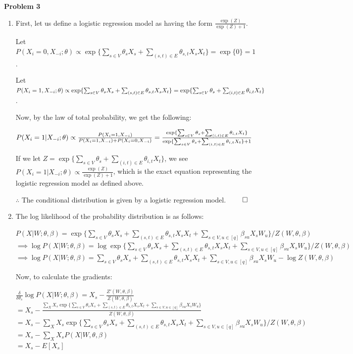 \documentclass[12pt]{article}
\begin{document}
\pagebreak\textbf{Problem 3}
\begin{enumerate}
	\item First, let us define a logistic regression model as having the form $\frac{\exp(Z)}{\exp(Z) + 1}$.
	
	Let $P(X_i = 0, X_{-i} ; \theta) \propto \exp\{\sum_{s\in V}\theta_s X_s + \sum_{(s, t) \in E} \theta_{s, t} X_s X_t\} = \exp\{0\} = 1$.
	
	Let $P(X_i = 1, X_{-i} ; \theta) \propto \exp\{\sum_{s\in V}\theta_s X_s + \sum_{(s, t) \in E} \theta_{s, t} X_s X_t\} \\
	= \exp\{\sum_{s\in V}\theta_s + \sum_{(i, t) \in E} \theta_{i, t} X_t\}$.
	
	Now, by the law of total probability, we get the following:
	
	$P(X_i = 1 \vert X_{-i} ; \theta) \propto \frac{P(X_i = 1, X_{-i})}{P(X_i = 1, X_{-i}) + P(X_i = 0, X_{-i})}\\
	= \frac{\exp\{\sum_{s\in V}\theta_s + \sum_{(i, t) \in E} \theta_{i, t} X_t\}}{\exp\{\sum_{s\in V}\theta_s + \sum_{(i, t) \in E} \theta_{i, t} X_t\} + 1}$
	
	If we let $Z = \exp\{\sum_{s\in V}\theta_s + \sum_{(i, t) \in E} \theta_{i, t} X_t\}$, we see $P(X_i = 1 \vert X_{-i} ; \theta) \propto \frac{\exp(Z)}{\exp(Z) + 1}$, which is the exact equation representing the logistic regression model as defined above.
	
	$\therefore$ The conditional distribution is given by a logistic regression model. $\qed$
	
	\item The log likelihood  of the probability distribution is as follows:
	
	$P(X \vert W; \theta, \beta) = \exp\Bigg\{\sum_{s\in V} \theta_sX_s + \sum_{(s, t)\in E} \theta_{s, t}X_sX_t + \sum_{s\in V, u\in [q]} \beta_{su}X_sW_u \Bigg\} / Z(W, \theta, \beta)$\\
	$\implies \log P(X \vert W; \theta, \beta) = \log \exp\Bigg\{\sum_{s\in V} \theta_sX_s + \sum_{(s, t)\in E} \theta_{s, t}X_sX_t + \sum_{s\in V, u\in [q]} \beta_{su}X_sW_u \Bigg\} / Z(W, \theta, \beta)$\\
	$\implies \log P(X \vert W; \theta, \beta) = \sum_{s\in V} \theta_sX_s + \sum_{(s, t)\in E} \theta_{s, t}X_sX_t + \sum_{s\in V, u\in [q]} \beta_{su}X_sW_u - \log Z(W, \theta, \beta)$
	
	Now, to calculate the gradients:
	
	$\frac{\delta}{\delta\theta_s}\log P(X \vert W; \theta, \beta) = X_s - \frac{Z'(W, \theta, \beta)}{Z(W, \theta, \beta)}$\\
	$= X_s - \frac{\sum_{X}X_s\exp\Big\{\sum_{s\in V} \theta_sX_s + \sum_{(s, t)\in E} \theta_{s, t}X_sX_t + \sum_{s\in V, u\in [q]} \beta_{su}X_sW_u\Big\}}{Z(W, \theta, \beta)}$\\
	$= X_s - \sum_{X}X_s\exp\Big\{\sum_{s\in V} \theta_sX_s + \sum_{(s, t)\in E} \theta_{s, t}X_sX_t + \sum_{s\in V, u\in [q]} \beta_{su}X_sW_u\Big\}/Z(W, \theta, \beta)$\\
	$= X_s - \sum_{X}X_s P(X \vert W, \theta, \beta)$\\
	$= X_s - E[X_s]$
	

\end{enumerate}
\end{document}
